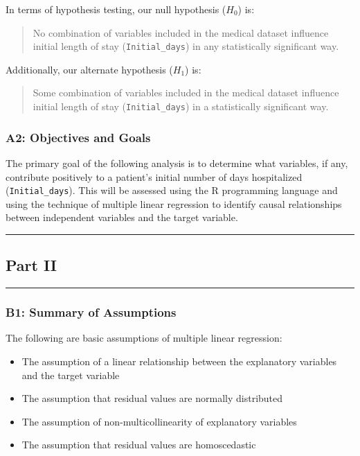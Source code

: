 \documentclass[
]{article}
\providecommand{\tightlist}{%
  \setlength{\itemsep}{0pt}\setlength{\parskip}{0pt}}
\begin{document}
In terms of hypothesis testing, our null hypothesis (\(H_0\)) is:

\begin{quote}
No combination of variables included in the medical dataset influence
initial length of stay (\texttt{Initial\_days}) in any statistically
significant way.
\end{quote}

Additionally, our alternate hypothesis (\(H_1\)) is:

\begin{quote}
Some combination of variables included in the medical dataset influence
initial length of stay (\texttt{Initial\_days}) in a statistically
significant way.
\end{quote}

\hypertarget{a2-objectives-and-goals}{%
\subsubsection{A2: Objectives and Goals}\label{a2-objectives-and-goals}}

The primary goal of the following analysis is to determine what
variables, if any, contribute positively to a patient's initial number
of days hospitalized (\texttt{Initial\_days}). This will be assessed
using the \(\mbox{R}\) programming language and using the technique of
multiple linear regression to identify causal relationships between
independent variables and the target variable.

\begin{center}\rule{0.5\linewidth}{0.5pt}\end{center}

\hypertarget{part-ii}{%
\subsection{Part II}\label{part-ii}}

\begin{center}\rule{0.5\linewidth}{0.5pt}\end{center}

\hypertarget{b1-summary-of-assumptions}{%
\subsubsection{B1: Summary of
Assumptions}\label{b1-summary-of-assumptions}}

The following are basic assumptions of multiple linear regression:

\begin{itemize}
\tightlist
\item
  The assumption of a linear relationship between the explanatory
  variables and the target variable
\item
  The assumption that residual values are normally distributed
\item
  The assumption of non-multicollinearity of explanatory variables
\item
  The assumption that residual values are homoscedastic
\end{itemize}
\end{document}

